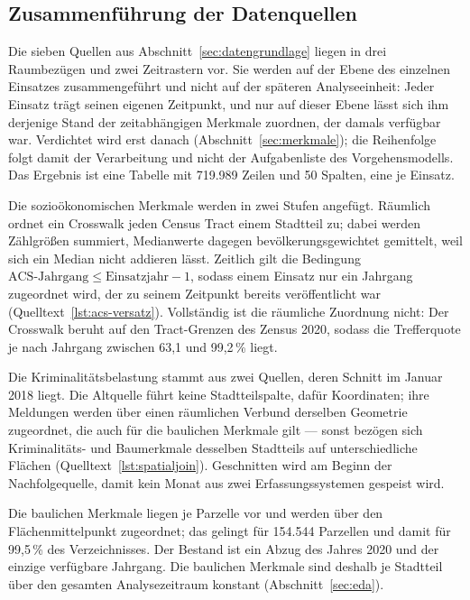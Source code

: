 
\subsection{Zusammenführung der Datenquellen}
\label{sec:integration}

Die sieben Quellen aus Abschnitt~\ref{sec:datengrundlage} liegen in drei
Raumbezügen und zwei Zeitrastern vor. Sie werden auf der Ebene des einzelnen
Einsatzes zusammengeführt und nicht auf der späteren Analyseeinheit: Jeder
Einsatz trägt seinen eigenen Zeitpunkt, und nur auf dieser Ebene lässt sich ihm
derjenige Stand der zeitabhängigen Merkmale zuordnen, der damals verfügbar war.
Verdichtet wird erst danach (Abschnitt~\ref{sec:merkmale}); die Reihenfolge
folgt damit der Verarbeitung und nicht der Aufgabenliste des Vorgehensmodells.
Das Ergebnis ist eine Tabelle mit 719.989 Zeilen und 50 Spalten, eine je
Einsatz.

Die sozioökonomischen Merkmale werden in zwei Stufen angefügt. Räumlich ordnet
ein Crosswalk jeden Census Tract einem Stadtteil zu; dabei werden Zählgrößen
summiert, Medianwerte dagegen bevölkerungsgewichtet gemittelt, weil sich ein
Median nicht addieren lässt. Zeitlich gilt die Bedingung
$\text{ACS-Jahrgang} \le \text{Einsatzjahr} - 1$, sodass einem Einsatz nur ein
Jahrgang zugeordnet wird, der zu seinem Zeitpunkt bereits veröffentlicht war
(Quelltext~\ref{lst:acs-versatz}). Vollständig ist die räumliche Zuordnung
nicht: Der Crosswalk beruht auf den Tract-Grenzen des Zensus 2020, sodass die
Trefferquote je nach Jahrgang zwischen 63,1 und 99,2\,\% liegt.

Die Kriminalitätsbelastung stammt aus zwei Quellen, deren Schnitt im Januar
2018 liegt. Die Altquelle führt keine Stadtteilspalte, dafür Koordinaten; ihre
Meldungen werden über einen räumlichen Verbund derselben Geometrie zugeordnet,
die auch für die baulichen Merkmale gilt --- sonst bezögen sich Kriminalitäts-
und Baumerkmale desselben Stadtteils auf unterschiedliche Flächen
(Quelltext~\ref{lst:spatialjoin}). Geschnitten wird am Beginn der
Nachfolgequelle, damit kein Monat aus zwei Erfassungssystemen gespeist wird.

Die baulichen Merkmale liegen je Parzelle vor und werden über den
Flächenmittelpunkt zugeordnet; das gelingt für 154.544 Parzellen und damit für
99,5\,\% des Verzeichnisses. Der Bestand ist ein Abzug des Jahres 2020 und der
einzige verfügbare Jahrgang. Die baulichen Merkmale sind deshalb je Stadtteil
über den gesamten Analysezeitraum konstant (Abschnitt~\ref{sec:eda}).

